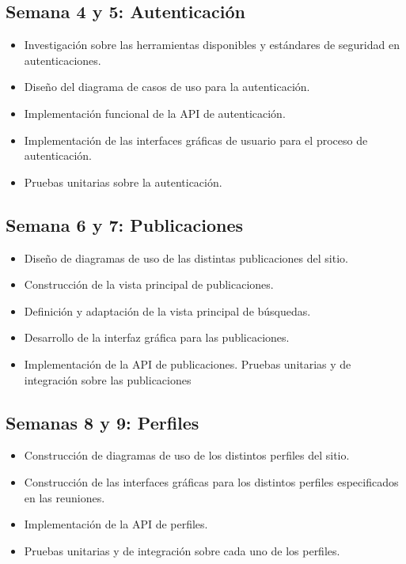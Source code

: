 \subsection{Semana 4 y 5: Autenticación}

\begin{itemize}
    \item Investigación sobre las herramientas disponibles y estándares de seguridad en autenticaciones.
    \item Diseño del diagrama de casos de uso para la autenticación.
    \item Implementación funcional de la API de autenticación.
    \item Implementación de las interfaces gráficas de usuario para el proceso de autenticación.
    \item Pruebas unitarias sobre la autenticación.
\end{itemize}

\subsection{Semana 6 y 7:  Publicaciones}

\begin{itemize}
    \item Diseño de diagramas de uso de las distintas publicaciones del sitio.
    \item Construcción de la vista principal de publicaciones.
    \item Definición y adaptación de la vista principal de búsquedas.
    \item Desarrollo de la interfaz gráfica para las publicaciones.
    \item Implementación de la API de publicaciones.
Pruebas unitarias y de integración sobre las publicaciones
\end{itemize}

\subsection{Semanas 8 y 9: Perfiles}

\begin{itemize}
    \item Construcción de diagramas de uso de los distintos perfiles del sitio.
    \item Construcción de las interfaces gráficas para los distintos perfiles especificados en las reuniones.
    \item Implementación de la API de perfiles.
    \item Pruebas unitarias y de integración sobre cada uno de los perfiles.
\end{itemize}

